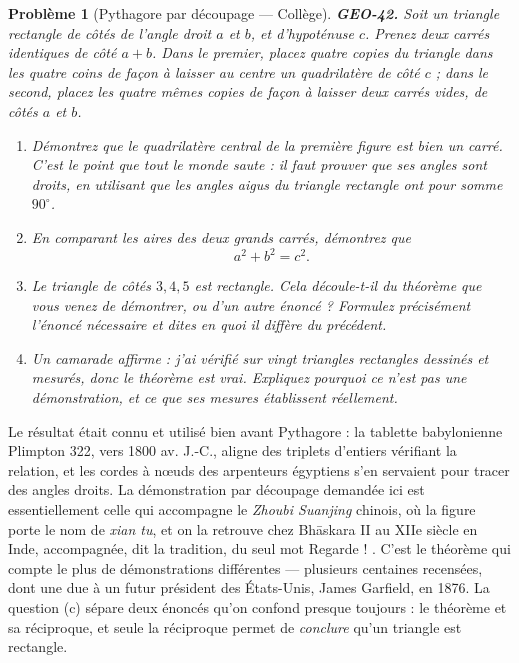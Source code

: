 \documentclass[11pt]{article}
\newtheorem{problem}{Problème}
\begin{document}
\bigskip

\begin{problem}[{Pythagore par découpage --- Collège}]
\textbf{GEO-42.} Soit un triangle rectangle de côtés de l'angle droit $ a $ et $ b $, et
d'hypoténuse $ c $. Prenez deux carrés identiques de côté $ a + b $. Dans le premier, placez
quatre copies du triangle dans les quatre coins de façon à laisser au centre un quadrilatère de côté
$ c $ ; dans le second, placez les quatre mêmes copies de façon à laisser deux carrés vides, de
côtés $ a $ et $ b $.
\begin{enumerate}
\item[(a)] Démontrez que le quadrilatère central de la première figure est bien un carré. C'est le point que
tout le monde saute : il faut prouver que ses angles sont droits, en utilisant que les angles aigus du
triangle rectangle ont pour somme $ 90^\circ $.
\item[(b)] En comparant les aires des deux grands carrés, démontrez que
\[ a^2 + b^2 = c^2 . \]
\item[(c)] Le triangle de côtés $ 3, 4, 5 $ est rectangle. Cela découle-t-il du théorème que vous venez de
démontrer, ou d'un autre énoncé ? Formulez précisément l'énoncé nécessaire et dites en quoi il diffère
du précédent.
\item[(d)] Un camarade affirme : \og{} j'ai vérifié sur vingt triangles rectangles dessinés et mesurés, donc le
théorème est vrai. \fg{} Expliquez pourquoi ce n'est pas une démonstration, et ce que ses mesures
établissent réellement.
\end{enumerate}

\end{problem}

\noindent Le résultat était connu et utilisé bien avant Pythagore : la tablette babylonienne
Plimpton 322, vers 1800 av. J.-C., aligne des triplets d'entiers vérifiant la relation, et les cordes
à n\oe{}uds des arpenteurs égyptiens s'en servaient pour tracer des angles droits. La démonstration par
découpage demandée ici est essentiellement celle qui accompagne le \textit{Zhoubi Suanjing} chinois, où
la figure porte le nom de \textit{xian tu}, et on la retrouve chez Bh\=askara II au XIIe siècle
en Inde, accompagnée, dit la tradition, du seul mot \og{} Regarde ! \fg{}. C'est le théorème qui compte le
plus de démonstrations différentes --- plusieurs centaines recensées, dont une due à un futur président
des États-Unis, James Garfield, en 1876. La question (c) sépare deux énoncés qu'on confond presque
toujours : le théorème et sa réciproque, et seule la réciproque permet de \textit{conclure} qu'un
triangle est rectangle.
\end{document}
